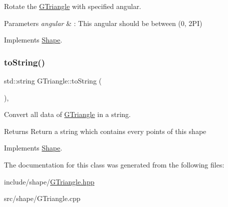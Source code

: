 Rotate the \hyperlink{classGTriangle}{G\+Triangle} with specified angular. 


\begin{DoxyParams}{Parameters}
{\em angular} & \+: This angular should be between (0, 2\+PI) \\
\hline
\end{DoxyParams}


Implements \hyperlink{classShape_a2dea8616fd40f2d69fd208715921982a}{Shape}.

\mbox{\label{classGTriangle_a8381aeea39fac0d52ad9e0d45b791b3b}} 
\subsubsection{\texorpdfstring{to\+String()}{toString()}}
{\footnotesize\ttfamily std\+::string G\+Triangle\+::to\+String (\begin{DoxyParamCaption}{ }\end{DoxyParamCaption})\hspace{0.3cm}{\ttfamily [override]}, {\ttfamily [virtual]}}



Convert all data of \hyperlink{classGTriangle}{G\+Triangle} in a string. 

\begin{DoxyReturn}{Returns}
Return a string which contains every points of this shape 
\end{DoxyReturn}


Implements \hyperlink{classShape_a98fa87c6dc4c7045fd6897a8f3bc186c}{Shape}.



The documentation for this class was generated from the following files\+:\begin{DoxyCompactItemize}
\item 
include/shape/\hyperlink{GTriangle_8hpp}{G\+Triangle.\+hpp}\item 
src/shape/G\+Triangle.\+cpp\end{DoxyCompactItemize}
